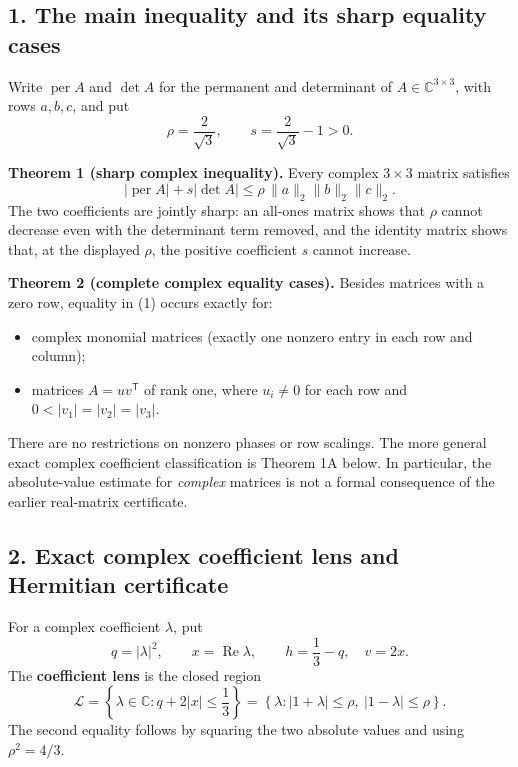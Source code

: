 \documentclass[
  11pt,
]{article}
\providecommand{\tightlist}{%
  \setlength{\itemsep}{0pt}\setlength{\parskip}{0pt}}
\begin{document}
\subsection{1. The main inequality and its sharp equality
cases}\label{the-main-inequality-and-its-sharp-equality-cases}

Write \(\operatorname{per}A\) and \(\det A\) for the permanent and
determinant of \(A\in\mathbb C^{3\times3}\), with rows \(a,b,c\), and
put \[
\rho=\frac2{\sqrt3},\qquad s=\frac2{\sqrt3}-1>0.
\]

\textbf{Theorem 1 (sharp complex inequality).} Every complex
\(3\times3\) matrix satisfies \[
\boxed{\quad
|\operatorname{per}A|+s|\det A|
\le\rho\,\|a\|_2\|b\|_2\|c\|_2.\quad}
\tag{1}
\] The two coefficients are jointly sharp: an all-ones matrix shows that
\(\rho\) cannot decrease even with the determinant term removed, and the
identity matrix shows that, at the displayed \(\rho\), the positive
coefficient \(s\) cannot increase.

\textbf{Theorem 2 (complete complex equality cases).} Besides matrices
with a zero row, equality in (1) occurs exactly for:

\begin{itemize}
\tightlist
\item
  complex monomial matrices (exactly one nonzero entry in each row and
  column);
\item
  matrices \(A=uv^{\mathsf T}\) of rank one, where \(u_i\ne0\) for each
  row and \(0<|v_1|=|v_2|=|v_3|\).
\end{itemize}

There are no restrictions on nonzero phases or row scalings. The more
general exact complex coefficient classification is Theorem 1A below. In
particular, the absolute-value estimate for \emph{complex} matrices is
not a formal consequence of the earlier real-matrix certificate.

\subsection{2. Exact complex coefficient lens and Hermitian
certificate}\label{exact-complex-coefficient-lens-and-hermitian-certificate}

For a complex coefficient \(\lambda\), put \[
q=|\lambda|^2,\qquad x=\operatorname{Re}\lambda,\qquad
h=\frac13-q,\quad v=2x.
\] The \textbf{coefficient lens} is the closed region \[
\mathcal L=\left\{\lambda\in\mathbb C:q+2|x|\le\frac13\right\}
=\left\{\lambda:|1+\lambda|\le\rho,\ |1-\lambda|\le\rho\right\}.
\tag{2a}
\] The second equality follows by squaring the two absolute values and
using \(\rho^2=4/3\).
\end{document}
